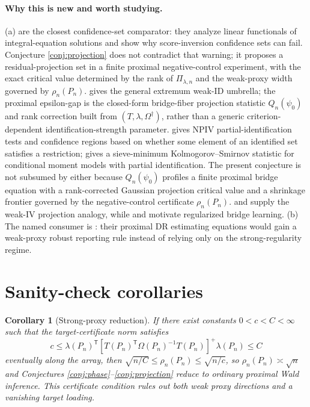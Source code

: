 \documentclass[11pt]{article}
\newcommand{\transpose}{\mathsf{T}}
\theoremstyle{definition}
\theoremstyle{plain}
\newtheorem{corollary}{Corollary}
\theoremstyle{remark}
\begin{document}
\paragraph{Why this is new and worth studying.}
(a) \cite[Sections 2--3]{SmuclerRobinsRotnitzky2025} are the closest
confidence-set comparator: they analyze linear functionals of
integral-equation solutions and show why score-inversion confidence sets can
fail.  Conjecture \ref{conj:projection} does not contradict that warning; it
proposes a residual-projection set in a finite proximal negative-control
experiment, with the exact critical value determined by the rank of
$\Pi_{\lambda,n}$ and the weak-proxy width governed by $\rho_n(P_n)$.
\cite[Section 2]{AndrewsCheng2012} gives the general extremum weak-ID
umbrella; the proximal epsilon-gap is the closed-form bridge-fiber projection
statistic $Q_n(\psi_0)$ and rank correction built from
$(T,\lambda,\Omega^\dagger)$, rather than a generic criterion-dependent
identification-strength parameter.
\cite[Sections 2--3]{Santos2012} gives NPIV partial-identification tests and
confidence regions based on whether some element of an identified set satisfies
a restriction; \cite[Section 2]{Hong2017} gives a sieve-minimum
Kolmogorov--Smirnov statistic for conditional moment models with partial
identification.  The present conjecture is not subsumed by either because
$Q_n(\psi_0)$ profiles a finite proximal bridge equation with a rank-corrected
Gaussian projection critical value and a shrinkage frontier governed by the
negative-control certificate $\rho_n(P_n)$.
\cite[Sections 3--4]{StockWrightYogo2002} and
\cite[Section 4]{AndrewsStockSun2019} supply the weak-IV projection analogy,
while \cite{KallusMaoUehara2021} and \cite{MastouriZhuGultchinEtAl2021}
motivate regularized bridge learning.  (b) The named consumer is
\cite{CuiPuShiMiaoTchetgen2024}: their proximal DR estimating equations would
gain a weak-proxy robust reporting rule instead of relying only on the
strong-regularity regime.

\section{Sanity-check corollaries}
\begin{corollary}[Strong-proxy reduction]\label{cor:strong}
If there exist constants $0<c<C<\infty$ such that the target-certificate norm
satisfies
\[
c\le
\lambda(P_n)^\transpose[T(P_n)^\transpose\Omega(P_n)^{-1}T(P_n)]^+
\lambda(P_n)
\le C
\]
eventually along the array, then
$\sqrt{n/C}\le\rho_n(P_n)\le\sqrt{n/c}$, so
$\rho_n(P_n)\asymp\sqrt n$ and Conjectures
\ref{conj:phase}--\ref{conj:projection} reduce to ordinary proximal Wald
inference.  This certificate condition rules out both weak proxy directions
and a vanishing target loading.
\end{corollary}
\end{document}
